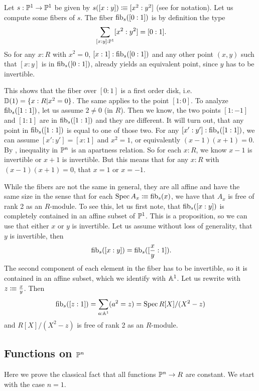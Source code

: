 \begin{example}
  Let $s:\mathbb{P}^1\to \mathbb{P}^1$ be given by $s([x:y])\vcentcolon\mspace{-1.2mu}\equiv [x^2:y^2]$
  (see  for notation).
  Let us compute some fibers of $s$. The fiber $\mathrm{fib}_s([0:1])$ is
  by definition the type
  \[
    \sum_{[x:y]:\bP^1}[x^2:y^2]=[0:1]\rlap{.}
  \]
  So for any $x:R$ with $x^2=0$, $[x:1]:\mathrm{fib}_s([0:1])$  and
  any other point $(x,y)$ such that $[x:y]$ is in $\mathrm{fib}_s([0:1])$,
  already yields an equivalent point, since $y$ has to be invertible.

  This shows that the fiber over $[0:1]$ is a first order disk, i.e. $\mathbb{D}(1)=\{x:R|x^2=0\}$.
  The same applies to the point $[1:0]$.
  To analyze $\mathrm{fib}_s([1:1])$, let us assume $2\neq 0$ (in $R$).
  Then we know, the two points $[1:-1]$ and $[1:1]$ are in $\mathrm{fib}_s([1:1])$ and they are different.
  It will turn out, that any point in $\mathrm{fib}_s([1:1])$ is equal to one of those two.
  For any $[x':y']:\mathrm{fib}_s([1:1])$, we can assume $[x':y']=[x:1]$ and $x^2=1$, or equivalently $(x-1)(x+1)=0$.
  By , inequality in $\mathbb{P}^n$ is an apartness relation.
  So for each $x:R$, we know $x-1$ is invertible or $x+1$ is invertible.
  But this means that for any $x:R$ with $(x-1)(x+1)=0$, that $x=1$ or $x=-1$.

  While the fibers are not the same in general,
  they are all affine and have the same size in the sense that for each $\operatorname{Spec} A_x\vcentcolon\mspace{-1.2mu}\equiv \mathrm{fib}_s(x)$,
  we have that $A_x$ is free of rank 2 as an $R$-module.
  To see this, let us first note,
  that $\mathrm{fib}_s([x:y])$ is completely contained in an affine subset of $\mathbb{P}^1$.
  This is a proposition, so we can use that either $x$ or $y$ is invertible.
  Let us assume without loss of generality, that $y$ is invertible,
  then
  \[
    \fib_s([x:y])=\fib_s([\frac{x}{y}:1])
    \rlap{.}
  \]
  The second component of each element in the fiber has to be invertible,
  so it is contained in an affine subset, which we identify with $\mathbb{A}^1$.
  Let us rewrite with $z\vcentcolon\mspace{-1.2mu}\equiv \frac{x}{y}$.
  Then
  \[
    \mathrm{fib}_s([z:1])=\sum_{a:\mathbb{A}^1}(a^2=z)=\operatorname{Spec} R[X]/(X^2-z)
  \]
  and $R[X]/(X^2-z)$ is free of rank 2 as an $R$-module.
\end{example}

\subsection{Functions on $\mathbb{P}^n$}

Here we prove the classical fact that all functions $\mathbb{P}^n\to R$ are constant.
We start with the case $n = 1$.

